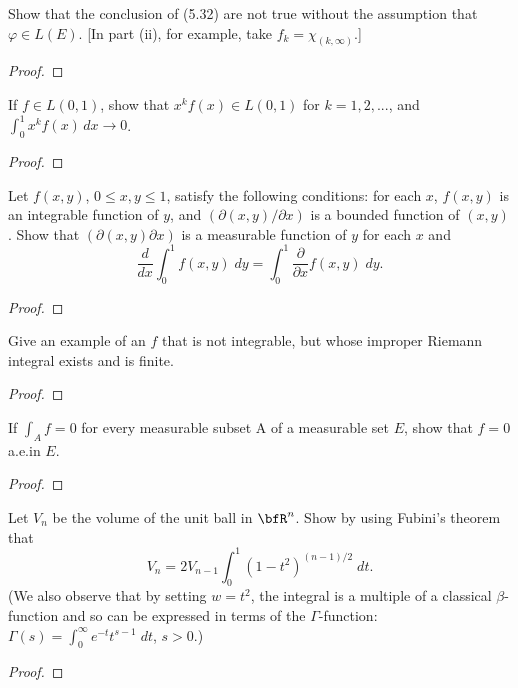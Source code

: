 \begin{problem}
Show that the conclusion of (5.32) are not true without the assumption that
$\varphi\in L(E)$. [In part (ii), for example, take $f_k=\chi_{(k,\infty)}$.]
\end{problem}
\begin{proof}

\end{proof}
\newpage

\begin{problem}
If $f\in L(0,1)$, show that $x^kf(x)\in L(0,1)$ for $k=1,2,...$, and
$\int_0^1 x^kf(x)\,dx\to 0$.
\end{problem}
\begin{proof}
\end{proof}
\newpage

\begin{problem}
Let $f(x,y)$, $0\leq x,y\leq 1$, satisfy the following conditions: for each
$x$, $f(x,y)$ is an integrable function of $y$, and
$(\partial(x,y)/\partial x)$ is a bounded function of $(x,y)$. Show that
$(\partial(x,y)\partial x)$ is a measurable function of $y$ for each $x$
and
\[
\frac{d}{dx}\int_0^1f(x,y)\;dy=\int_0^1\frac{\partial}{\partial x}f(x,y)\;dy.
\]
\end{problem}
\begin{proof}
\end{proof}
\newpage

\begin{problem}
Give an example of an $f$ that is not integrable, but whose improper
Riemann integral exists and is finite.
\end{problem}
\begin{proof}
\end{proof}
\newpage

\begin{problem}
If $\int_A f=0$ for every measurable subset A of a measurable set $E$, show
that $f=0$ a.e.\@ in $E$.
\end{problem}
\begin{proof}
\end{proof}
\newpage

\begin{problem}
 Let $V_n$ be the volume of the unit ball in $\bfR^n$. Show by using
 Fubini's theorem that
\[
V_n=2V_{n-1}\int_0^1\left(1-t^2\right)^{(n-1)/2}\;dt.
\]
(We also observe that by setting $w=t^2$, the integral is a multiple of a
classical $\beta$-function and so can be expressed in terms of the
$\Gamma$-function: $\Gamma(s)=\int_0^\infty e^{-t}t^{s-1}\;dt$, $s>0$.)
\end{problem}
\begin{proof}
\end{proof}
\newpage

